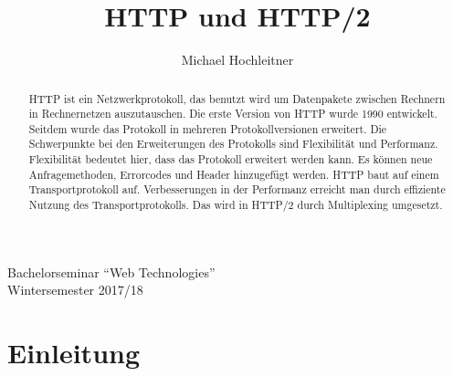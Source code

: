 \documentclass{llncs}
\begin{document}
\title{HTTP und HTTP/2}
\author{Michael Hochleitner}

\maketitle 
\begin{center}
Bachelorseminar ``Web Technologies'' \\
Wintersemester 2017/18
\end{center}

\begin{abstract}
HTTP ist ein Netzwerkprotokoll, das benutzt wird um Datenpakete zwischen Rechnern in Rechnernetzen auszutauschen. Die erste Version von HTTP wurde 1990 entwickelt. Seitdem wurde das Protokoll in mehreren Protokollversionen erweitert. Die Schwerpunkte bei den Erweiterungen des Protokolls sind Flexibilität und Performanz. Flexibilität bedeutet hier, dass das Protokoll erweitert werden kann. Es können neue Anfragemethoden, Errorcodes und Header hinzugefügt werden. HTTP baut auf einem Transportprotokoll auf. Verbesserungen in der Performanz erreicht man durch effiziente Nutzung des Transportprotokolls. Das wird in HTTP/2 durch Multiplexing umgesetzt.
\end{abstract}

\section{Einleitung}
\end{document}
